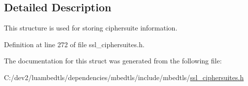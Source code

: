 \subsection{Detailed Description}
This structure is used for storing ciphersuite information. 

Definition at line 272 of file ssl\-\_\-ciphersuites.\-h.



The documentation for this struct was generated from the following file\-:\begin{DoxyCompactItemize}
\item 
C\-:/dev2/luambedtls/dependencies/mbedtls/include/mbedtls/\hyperlink{ssl__ciphersuites_8h}{ssl\-\_\-ciphersuites.\-h}\end{DoxyCompactItemize}
